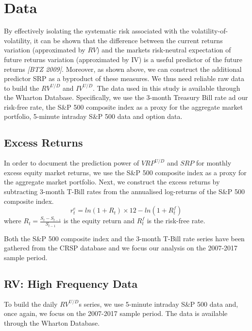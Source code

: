 
\section{Data}\label{sec:chapter3}

By effectively isolating the systematic risk associated with the volatility-of-volatility, it can be shown that the difference between the current returns variation (approximated by $RV$) and the markets risk-neutral expectation of future returns variation (approximated by IV) is a useful predictor of the future returns \textit{[BTZ 2009]}. Moreover, as shown above, we can construct the additional predictor SRP as a byproduct of these measures. We thus need reliable raw data to build the $RV^{U/D}$ and $IV^{U/D}$. The data used in this study is available through the Wharton Database. Specifically, we use the 3-month Treasury Bill rate ad our risk-free rate, the S\&P 500 composite index as a proxy for the aggregate market portfolio, 5-minute intraday S\&P 500 data and option data.

\subsection{Excess Returns}
In order to document the prediction power of $VRP^{U/D}$ and $SRP$ for monthly excess equity market returns, we use the S\&P 500 composite index as a proxy for the aggregate market portfolio. Next, we construct the excess returns by subtracting 3-month T-Bill rates from the annualised log-returns of the S\&P 500 composite index. 
\begin{equation}
r^e_t=ln(1+R_t) \times 12 - ln(1+R_t^f)
\end{equation}
where $R_t= \frac{S_t-S_{t-1}}{S_{t-1}}$ is the equity return and $R_t^f$ is the risk-free rate. 

\vspace{4mm}
Both the S\&P 500 composite index and the 3-month T-Bill rate series have been gathered from the CRSP database and we focus our analysis on the 2007-2017 sample period. 

\subsection{RV: High Frequency Data}
To build the daily $RV^{U/D}$s series, we use 5-minute intraday S\&P 500 data and, once again, we focus on the 2007-2017 sample period. The data is available through the Wharton Database.

